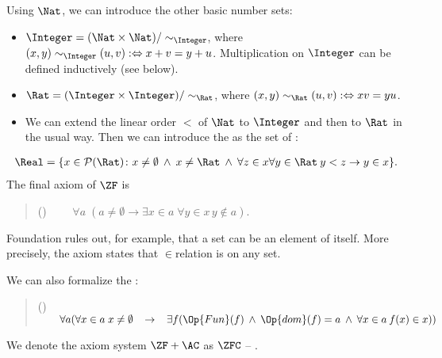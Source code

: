 \documentclass[letterpaper,10pt,english]{jupyterBook}
\begin{document}
\sphinxAtStartPar
Using \(\Nat\), we can introduce the other basic number sets:
\begin{itemize}
\item {} 
\sphinxAtStartPar
\(\Integer = (\Nat\times\Nat)/ \sim_\Integer\), where \((x,y) \sim_\Integer (u,v) :\Leftrightarrow  x+v = y+u\). Multiplication on \(\Integer\) can be defined inductively (see below).

\item {} 
\sphinxAtStartPar
\(\Rat = (\Integer\times\Integer)/\sim_\Rat\), where \((x,y) \sim_\Rat (u,v) :\Leftrightarrow xv = yu\).

\item {} 
\sphinxAtStartPar
We can extend the linear order \(<\) of \(\Nat\) to \(\Integer\) and then to \(\Rat\) in the usual way. Then we can introduce the  as the set of :

\end{itemize}
\begin{equation*}
\begin{split}
\Real = \{ x \in \mathcal{P}(\Rat) \colon x \neq \emptyset \: \wedge \: x \neq \Rat \: \wedge \: \forall z \in x \forall y \in \Rat \: y < z \to y \in x \}.
\end{split}
\end{equation*}
\sphinxAtStartPar
The final axiom of \(\ZF\) is
\begin{quote}

\sphinxAtStartPar
() \(\qquad \forall a \;( a \neq \emptyset \to \exists x \in a \; \forall y \in x \, y \not \in a)\).
\end{quote}

\sphinxAtStartPar
Foundation rules out, for example, that a set can be an element of itself. More precisely, the axiom states that \(\in\)\sphinxhyphen{}relation is  on any set.

\sphinxAtStartPar
We can also formalize the :
\begin{quote}

\sphinxAtStartPar
() \(\qquad \forall a ( \forall x \in a \; x \neq \emptyset \;\;\; \to \;\;\; \exists f (\Op{Fun}(f) \:\wedge\: \Op{dom}(f) = a \:\wedge\: \forall x \in a \: f(x) \in x))\)
\end{quote}

\sphinxAtStartPar
We denote the axiom system \(\ZF + \AC\) as \(\ZFC\) – .
\end{document}
